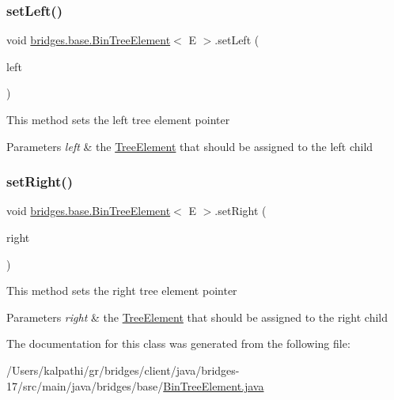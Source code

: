 \subsubsection{\texorpdfstring{set\+Left()}{setLeft()}}
{\footnotesize\ttfamily void \mbox{\hyperlink{classbridges_1_1base_1_1_bin_tree_element}{bridges.\+base.\+Bin\+Tree\+Element}}$<$ E $>$.set\+Left (\begin{DoxyParamCaption}\item[{\mbox{\hyperlink{classbridges_1_1base_1_1_bin_tree_element}{Bin\+Tree\+Element}}$<$ E $>$}]{left }\end{DoxyParamCaption})}

This method sets the left tree element pointer 
\begin{DoxyParams}{Parameters}
{\em left} & the \mbox{\hyperlink{classbridges_1_1base_1_1_tree_element}{Tree\+Element}} that should be assigned to the left child \\
\hline
\end{DoxyParams}
\mbox{\label{classbridges_1_1base_1_1_bin_tree_element_abc40e3ed4cfaf4b74aacfd3657e89ebc}} 
\subsubsection{\texorpdfstring{set\+Right()}{setRight()}}
{\footnotesize\ttfamily void \mbox{\hyperlink{classbridges_1_1base_1_1_bin_tree_element}{bridges.\+base.\+Bin\+Tree\+Element}}$<$ E $>$.set\+Right (\begin{DoxyParamCaption}\item[{\mbox{\hyperlink{classbridges_1_1base_1_1_bin_tree_element}{Bin\+Tree\+Element}}$<$ E $>$}]{right }\end{DoxyParamCaption})}

This method sets the right tree element pointer


\begin{DoxyParams}{Parameters}
{\em right} & the \mbox{\hyperlink{classbridges_1_1base_1_1_tree_element}{Tree\+Element}} that should be assigned to the right child \\
\hline
\end{DoxyParams}


The documentation for this class was generated from the following file\+:\begin{DoxyCompactItemize}
\item 
/\+Users/kalpathi/gr/bridges/client/java/bridges-\/17/src/main/java/bridges/base/\mbox{\hyperlink{_bin_tree_element_8java}{Bin\+Tree\+Element.\+java}}\end{DoxyCompactItemize}
